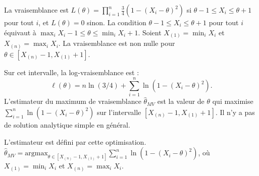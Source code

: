 {\begin{enumerate}
{	La vraisemblance est \( L(\theta) = \prod_{i=1}^n \frac{3}{4} (1 - (X_i - \theta)^2) \) si \( \theta - 1 \le X_i \le \theta + 1 \) pour tout \( i \), et \( L(\theta) = 0 \) sinon.
	La condition \( \theta - 1 \le X_i \le \theta + 1 \) pour tout \( i \) équivaut à \( \max_i X_i - 1 \le \theta \le \min_i X_i + 1 \). Soient \( X_{(1)} = \min_i X_i \) et \( X_{(n)} = \max_i X_i \). La vraisemblance est non nulle pour \( \theta \in [X_{(n)} - 1, X_{(1)} + 1] \).
	
	Sur cet intervalle, la log-vraisemblance est : $$ \ell(\theta) = n \ln(3/4) + \sum_{i=1}^n \ln(1 - (X_i - \theta)^2). $$
	L'estimateur du maximum de vraisemblance \( \hat{\theta}_{MV} \) est la valeur de \( \theta \) qui maximise \( \sum_{i=1}^n \ln(1 - (X_i - \theta)^2) \) sur l'intervalle \( [X_{(n)} - 1, X_{(1)} + 1] \). Il n'y a pas de solution analytique simple en général. 
	
	L'estimateur est défini par cette optimisation.
	\( \hat{\theta}_{MV} = \mathrm{argmax}_{\theta \in [X_{(n)}-1, X_{(1)}+1]} \sum_{i=1}^n \ln(1 - (X_i - \theta)^2) \), où \( X_{(1)} = \min_i X_i \) et \( X_{(n)} = \max_i X_i \).}
\end{enumerate}

}